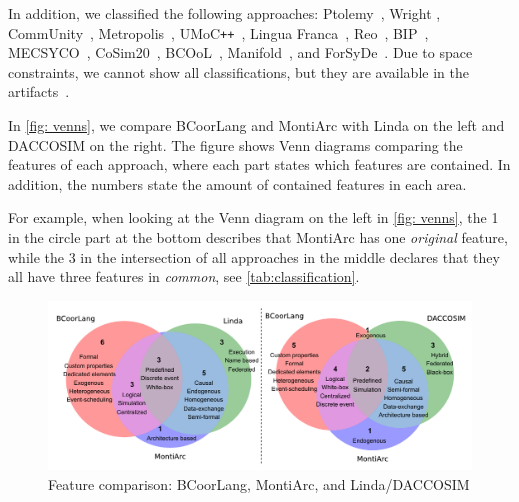 \documentclass[runningheads]{llncs}
\begin{document}
In addition, we classified the following approaches: Ptolemy~\cite{ekerTamingHeterogeneityPtolemy2003,ptolemaeusSystemDesignModeling2014}, Wright \cite{allenFormalBasisArchitectural1997,allenFormalApproachSoftware1997}, CommUnity~\cite{fiadeiroSemanticsArchitecturalConnectors1997,oliveiraCommUnityWorkbench2007}, Metropolis~\cite{balarinMetropolisIntegratedElectronic2003}, UMoC\texttt{++}~\cite{mathaikuttyUMoCBasedMultiMoC2006}, Lingua Franca~\cite{lohstrohReactorsDeterministicModel2020,lohstrohLinguaFrancaDeterministic2021}, Reo~\cite{arbabReoChannelbasedCoordination2004}, BIP~\cite{bliudzeAlgebraConnectorsStructuring2008,basuRigorousComponentBasedSystem2011},
MECSYCO~\cite{camusCosimulationCyberphysicalSystems2018,camusHybridCosimulationFMUs2016},
CoSim20~\cite{liboniComplexSystemsCosimulation2021},
BCOoL~\cite{varalarsenBehavioralCoordinationOperator2015,varalarsenBCOolBehavioralCoordination2016},
Manifold~\cite{arbabOverviewManifoldIts1993,papadopoulosModellingActivitiesInformation1998}, and ForSyDe~\cite{sanderSystemModelingTransformational2004,sanderForSyDeSystemDesign2016}.
Due to space constraints, we cannot show all classifications, but they are available in the artifacts~\cite{timkrauterArtifactsCoordination2024}.

In \autoref{fig: venns}, we compare BCoorLang and MontiArc with Linda on the left and DACCOSIM on the right.
The figure shows Venn diagrams comparing the features of each approach, where each part states which features are contained.
In addition, the numbers state the amount of contained features in each area.

For example, when looking at the Venn diagram on the left in \autoref{fig: venns}, the \textsf{1} in the circle part at the bottom describes that MontiArc has one \textit{original} feature, while the \textsf{3} in the intersection of all approaches in the middle declares that they all have three features in \textit{common}, see \autoref{tab:classification}.

\begin{figure}[ht]
	\centering
	\includegraphics[width=1\textwidth]{images/venns}
	\caption{Feature comparison: BCoorLang, MontiArc, and Linda/DACCOSIM}
	\label{fig: venns}
\end{figure}
\end{document}
